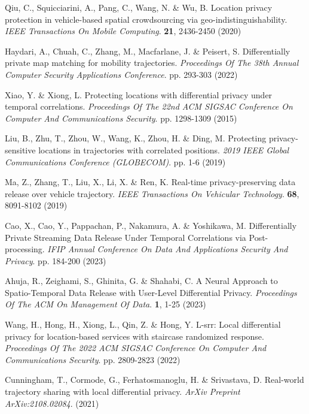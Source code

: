 \begin{thebibliography}{10}
\begin{small}
Qiu, C., Squicciarini, A., Pang, C., Wang, N. \& Wu, B. Location privacy protection in vehicle-based spatial crowdsourcing via geo-indistinguishability. {\em IEEE Transactions On Mobile Computing}. \textbf{21}, 2436-2450 (2020)

Haydari, A., Chuah, C., Zhang, M., Macfarlane, J. \& Peisert, S. Differentially private map matching for mobility trajectories. {\em Proceedings Of The 38th Annual Computer Security Applications Conference}. pp. 293-303 (2022)



Xiao, Y. \& Xiong, L. Protecting locations with differential privacy under temporal correlations. {\em Proceedings Of The 22nd ACM SIGSAC Conference On Computer And Communications Security}. pp. 1298-1309 (2015)

Liu, B., Zhu, T., Zhou, W., Wang, K., Zhou, H. \& Ding, M. Protecting privacy-sensitive locations in trajectories with correlated positions. {\em 2019 IEEE Global Communications Conference (GLOBECOM)}. pp. 1-6 (2019)

Ma, Z., Zhang, T., Liu, X., Li, X. \& Ren, K. Real-time privacy-preserving data release over vehicle trajectory. {\em IEEE Transactions On Vehicular Technology}. \textbf{68}, 8091-8102 (2019)

Cao, X., Cao, Y., Pappachan, P., Nakamura, A. \& Yoshikawa, M. Differentially Private Streaming Data Release Under Temporal Correlations via Post-processing. {\em IFIP Annual Conference On Data And Applications Security And Privacy}. pp. 184-200 (2023)

Ahuja, R., Zeighami, S., Ghinita, G. \& Shahabi, C. A Neural Approach to Spatio-Temporal Data Release with User-Level Differential Privacy. {\em Proceedings Of The ACM On Management Of Data}. \textbf{1}, 1-25 (2023)

Wang, H., Hong, H., Xiong, L., Qin, Z. \& Hong, Y. L-srr: Local differential privacy for location-based services with staircase randomized response. {\em Proceedings Of The 2022 ACM SIGSAC Conference On Computer And Communications Security}. pp. 2809-2823 (2022)

Cunningham, T., Cormode, G., Ferhatosmanoglu, H. \& Srivastava, D. Real-world trajectory sharing with local differential privacy. {\em ArXiv Preprint ArXiv:2108.02084}. (2021)


\end{small}
\end{thebibliography}

